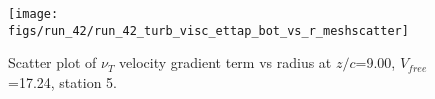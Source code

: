 \begin{figure}[H]
\centering
\texttt{[image: figs/run\_42/run\_42\_turb\_visc\_ettap\_bot\_vs\_r\_meshscatter]}
\caption{Scatter plot of $\nu_T$ velocity gradient term vs radius at $z/c$=9.00, $V_{free}$=17.24, station 5.}
\label{fig:run_42_turb_visc_ettap_bot_vs_r_meshscatter}
\end{figure}


